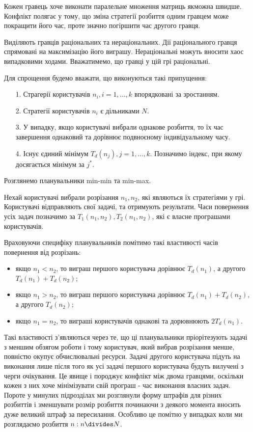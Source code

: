 Кожен гравець хоче виконати паралельне множення матриць якможна швидше. Конфлікт полягає у тому, що зміна стратегії розбиття одним гравцем може покращити його час, проте значно погіршити час другого гравця.

Виділяють гравців раціональних та нераціональних. Дії раціонального гравця спрямовані на максимізацію його виграшу. Нераціональні можуть вносити хаос випадковими ходами. Вважатимемо, що гравці у цій грі раціональні.

Для спрощення будемо вважати, що виконуються такі припущення:
\begin{itemize}
	\item[1.] Страгерії користувачів $n_i, i=1,\ldots,k$ впорядковані за зростанням.
	\item[2.] Стратегії користувачів $n_i$ є дільниками $N$.
	\item[3.] У випадку, якщо користувачі вибрали однакове розбиття, то їх час завершення однаковий та дорівнює подвноєному індивідуальному часу.
	\item[4.] Існує єдиний мінімум $T_d(n_j), j=1,\ldots,k$. Позначимо індекс, при якому досягається мінімум за $j^*$.
\end{itemize}

Розглянемо планувальники min-min та min-max.

Нехай користувачі вибрали розрізання $n_1,n_2$, які являються їх стратегіями у грі. Користувачі відправляють свої задачі, та отримують результати. Часи повернення усіх задач позначимо за $T_1(n_1,n_2),T_2(n_1,n_2)$, які є власне програшами користувачів.

Враховуючи специфіку планувальників помітимо такі властивості часів повернення від розрізань:
\begin{itemize}
	\item якщо $n_1 < n_2$, то виграш першого користувача дорівнює $T_d(n_1)$, а другого $T_d(n_1) + T_d(n_2)$;
	\item якщо $n_1 > n_2$, то виграш першого користувача дорівнює $T_d(n_1) + T_d(n_2)$, а другого $T_d(n_2)$;
	\item якщо $n_1 = n_2$, то виграші користувачів однакові та дорювнюють $2T_d(n_1)$.
\end{itemize}

Такі властивості з'являються через те, що ці планувальники пріорітезують задачі з меншим обзягом роботи і тому користувач, який вибрав розрізання менше, повністю окупує обчислювальні ресурси. Задачі другого користувача підуть на виконання лише після того як усі задачі першого користувача будуть вилучені з черги очікування. Це явище і породжує конфлікт між двома гравцями, оскільки кожен з них хоче мінімізувати свій програш - час виконання власних задач. Пороте у минулих підрозділах ми розглянули форму штрафів для різних розбиттів і зменшувати розмір розбиття починаючи з деякого момента вносить дуже великий штраф за пересилання. Особливо це помітно у випадках коли ми розглядаємо розбиття $n: n \divides N$.


